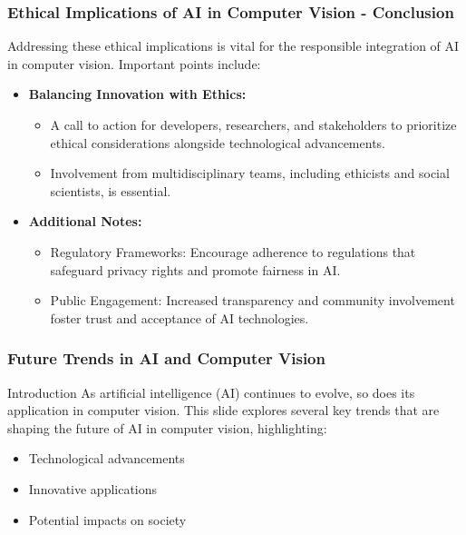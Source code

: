 \documentclass[aspectratio=169]{beamer}
\begin{document}
\begin{frame}[fragile]
    \frametitle{Ethical Implications of AI in Computer Vision - Conclusion}
    Addressing these ethical implications is vital for the responsible integration of AI in computer vision. Important points include:
    \begin{itemize}
        \item \textbf{Balancing Innovation with Ethics:}
        \begin{itemize}
            \item A call to action for developers, researchers, and stakeholders to prioritize ethical considerations alongside technological advancements.
            \item Involvement from multidisciplinary teams, including ethicists and social scientists, is essential.
        \end{itemize}
        \item \textbf{Additional Notes:}
        \begin{itemize}
            \item Regulatory Frameworks: Encourage adherence to regulations that safeguard privacy rights and promote fairness in AI.
            \item Public Engagement: Increased transparency and community involvement foster trust and acceptance of AI technologies.
        \end{itemize}
    \end{itemize}
\end{frame}

\begin{frame}[fragile]
    \frametitle{Future Trends in AI and Computer Vision}
    \begin{block}{Introduction}
        As artificial intelligence (AI) continues to evolve, so does its application in computer vision. 
        This slide explores several key trends that are shaping the future of AI in computer vision, highlighting:
        \begin{itemize}
            \item Technological advancements
            \item Innovative applications
            \item Potential impacts on society
        \end{itemize}
    \end{block}
\end{frame}
\end{document}
